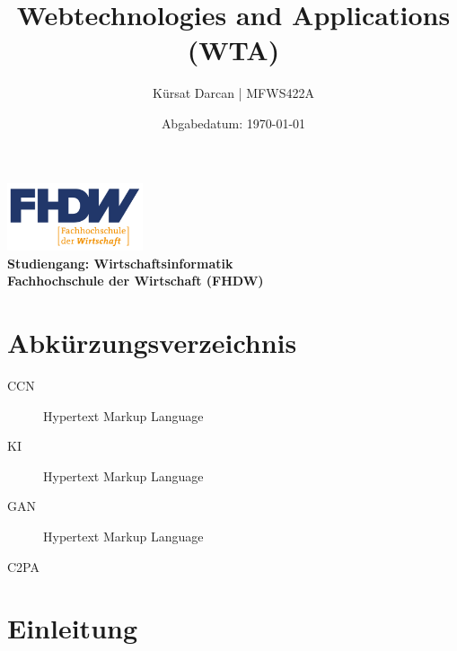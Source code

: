 \documentclass[a4paper,12pt]{article}
\title{\textbf{Webtechnologies and Applications (WTA)}}
\author{Kürsat Darcan | MFWS422A}
\date{Abgabedatum: \today}
\begin{document}
\maketitle
\thispagestyle{empty}
\vspace{2cm}
\begin{center}
    \includegraphics[width=0.3\textwidth]{FHDW_Logo_RGB-01.svg.png} %
    \\
    \vspace{1cm}
    \textbf{Studiengang: Wirtschaftsinformatik}\\
    \textbf{Fachhochschule der Wirtschaft (FHDW)}
\end{center}
\newpage

\renewcommand{\thepage}{\roman{page}} %
\tableofcontents
\newpage



\section*{Abkürzungsverzeichnis}
\begin{description}
    \item[CCN] Hypertext Markup Language
    \item[KI] Hypertext Markup Language
    \item[GAN] Hypertext Markup Language
    \item[C2PA]
\end{description}
\newpage

\renewcommand{\thepage}{\arabic{page}} %
\setcounter{page}{1}


\section{Einleitung}
\end{document}
